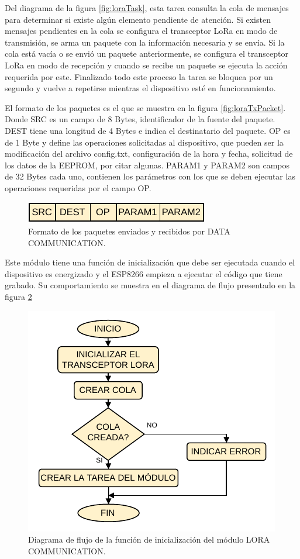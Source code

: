 Del diagrama de la figura \ref{fig:loraTask}, esta tarea consulta la cola de mensajes para determinar si existe algún elemento pendiente de atención. Si existen mensajes pendientes en la cola se configura el transceptor LoRa en modo de transmisión, se arma un paquete con la información necesaria y se envía. Si la cola está vacía o se envió un paquete anteriormente, se configura el transceptor LoRa en modo de recepción y cuando se recibe un paquete se ejecuta la acción requerida por este. Finalizado todo este proceso la tarea se bloquea por un segundo y vuelve a repetirse mientras el dispositivo esté en funcionamiento.

El formato de los paquetes es el que se muestra en la figura \ref{fig:loraTxPacket}. Donde SRC es un campo de 8 Bytes, identificador de la fuente del paquete. DEST tiene una longitud de 4 Bytes e indica el destinatario del paquete. OP es de 1 Byte y define las operaciones solicitadas al dispositivo, que pueden ser la modificación del archivo config.txt, configuración de la hora y fecha, solicitud de los datos de la EEPROM, por citar algunas. PARAM1 y PARAM2 son campos de 32 Bytes cada uno, contienen los parámetros con los que se deben ejecutar las operaciones requeridas por el campo OP.

\begin{figure}[h]
	\centering
	\includegraphics[scale=1]{./Figures/lora_communication_rx_packet.pdf}
	\caption{Formato de los paquetes enviados y recibidos por DATA COMMUNICATION.}
		\label{fig:loraRxPacket}
\end{figure}

Este módulo tiene una función de inicialización que debe ser ejecutada cuando el dispositivo es energizado y el ESP8266 empieza a ejecutar el código que tiene grabado. Su comportamiento se muestra en el diagrama de flujo presentado en la figura \ref{fig:loraInit}

\begin{figure}[h]
	\centering
	\includegraphics[scale=1]{./Figures/lora_communication_init.pdf}
	\caption{Diagrama de flujo de la función de inicialización del módulo LORA COMMUNICATION.}
		\label{fig:loraInit}
\end{figure}

